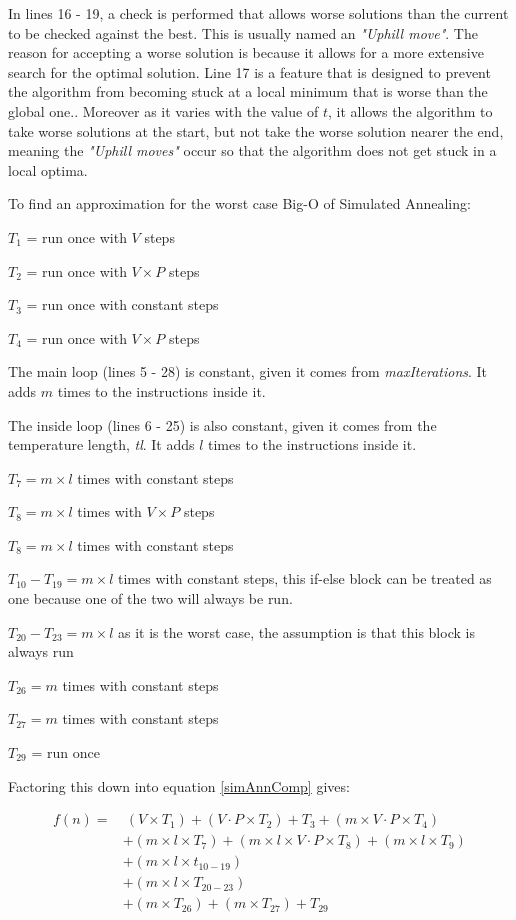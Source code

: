 \documentclass[12pt]{report}
\begin{document}
In lines 16 - 19, a check is performed that allows worse solutions than the current to be checked against the best. This is usually named an \textit{"Uphill move"}. The reason for accepting a worse solution is because it allows for a more extensive search for the optimal solution. Line 17 is a feature that is designed to prevent the algorithm from becoming stuck at a local minimum that is worse than the global one.\cite{simAnnealing}. Moreover as it varies with the value of $t$, it allows the algorithm to take worse solutions at the start, but not take the worse solution nearer the end, meaning the \textit{"Uphill moves"} occur so that the algorithm does not get stuck in a local optima.

To find an approximation for the worst case Big-O of Simulated Annealing:

$T_1$ = run once with $V$ steps

$T_2$ = run once with $V \times P$ steps

$T_3$ = run once with constant steps

$T_4$ = run once with $V \times P$ steps

The main loop (lines 5 - 28) is constant, given it comes from \textit{maxIterations}. It adds $m$ times to the instructions inside it.

The inside loop (lines 6 - 25) is also constant, given it comes from the temperature length, \textit{tl}. It adds $l$ times to the instructions inside it.

$T_7 = m \times l$ times with constant steps

$T_8 = m \times l$ times with $V \times P$ steps

$T_8 = m \times l$ times with constant steps

$T_{10} - T_{19} = m \times l$ times with constant steps, this if-else block can be treated as one because one of the two will always be run.

$T_{20} - T_{23} = m \times l$ as it is the worst case, the assumption is that this block is always run

$T_{26} = m$ times with constant steps

$T_{27} = m$ times with constant steps

$T_{29}$ = run once

Factoring this down into equation \ref{simAnnComp} gives: 

\begin{equation}\label{simAnnComp}
\begin{aligned}
	f(n) ={} & \ (V \times T_1) + (V \cdot P \times T_2) + T_3  + (m \times V \cdot P \times T_4) \\
	 	& + (m \times l \times T_7) + (m \times l \times V \cdot P  \times T_8) + (m \times l \times T_9) \\
		& + (m \times l \times t_{10 - 19}) \\
		& + (m \times l \times T_{20 - 23}) \\
		& + (m \times T_{26}) + (m \times T_{27}) + T_{29}
\end{aligned}
\end{equation}
\end{document}
